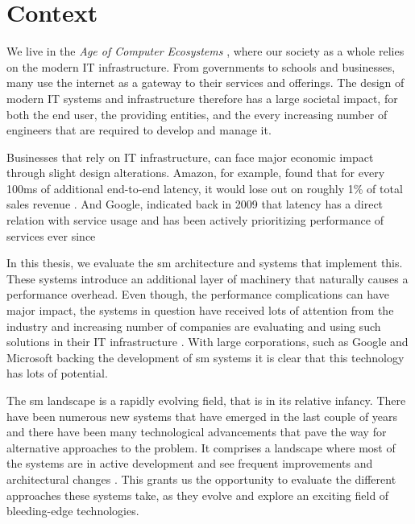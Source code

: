 \section{Context}
\label{sec:introduction:context}





We live in the \textit{Age of Computer Ecosystems} \cite{Iosup2018}, where our society as a whole relies on the modern IT infrastructure. From governments to schools and businesses, many use the internet as a gateway to their services and offerings. The design of modern IT systems and infrastructure therefore has a large societal impact, for both the end user, the providing entities, and the every increasing number of engineers \cite{it-employment-worldwide} that are required to develop and manage it.

Businesses that rely on IT infrastructure, can face major economic impact through slight design alterations. Amazon, for example, found that for every 100ms of additional end-to-end latency, it would lose out on roughly 1\% of total sales revenue \cite{amazon-latency-conversion-drop}. And Google, indicated back in 2009 \cite{google-latency-bounce-rate} that latency has a direct relation with service usage and has been actively prioritizing performance of services ever since

In this thesis, we evaluate the \gls{sm} architecture and systems that implement this. These systems introduce an additional layer of machinery that naturally causes a performance overhead. Even though, the performance complications can have major impact, the systems in question have received lots of attention from the industry and increasing number of companies are evaluating and using such solutions in their IT infrastructure \cite{cncf-survey-2021}.  With large corporations, such as Google and Microsoft backing the development of \gls{sm} systems it is clear that this technology has lots of potential. 

The \gls{sm} landscape is a rapidly evolving field, that is in its relative infancy.  There have been numerous new systems that have emerged in the last couple of years and there have been many technological advancements that pave the way for alternative approaches to the problem. It comprises a landscape where most of the systems are in active development and see frequent improvements and architectural changes \cite{istio-merbridge, cilium-mesh}. This grants us the opportunity to evaluate the different approaches these systems take, as they evolve and explore an exciting field of bleeding-edge technologies.

